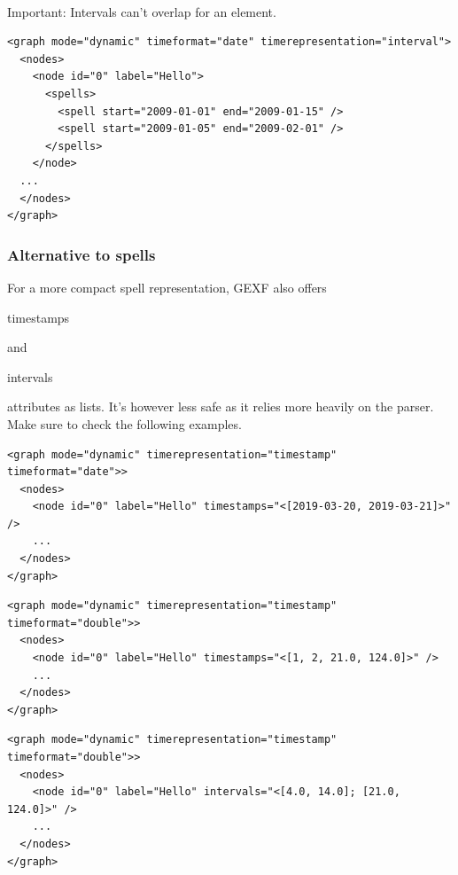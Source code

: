 \documentclass[a4paper,10pt]{article}
\begin{document}
\paragraph{}
Important: Intervals can't overlap for an element.

\lstset{ style=gexf }
\begin{lstlisting}[caption={Overlapping intervals (not allowed)}]
<graph mode="dynamic" timeformat="date" timerepresentation="interval">
  <nodes>
    <node id="0" label="Hello">
      <spells>
        <spell start="2009-01-01" end="2009-01-15" />
        <spell start="2009-01-05" end="2009-02-01" />
      </spells>
    </node>
  ...
  </nodes>
</graph>
\end{lstlisting}

\subsubsection{Alternative to spells}

For a more compact spell representation, GEXF also offers \begin{footnotesize}timestamps\end{footnotesize} and \begin{footnotesize}intervals\end{footnotesize} attributes as lists. It's however less safe as it relies more heavily on the parser. Make sure to check the following examples.

\lstset{ style=gexf }
\begin{lstlisting}[caption={Timestamp list (Date)}]
<graph mode="dynamic" timerepresentation="timestamp" timeformat="date">>
  <nodes>
    <node id="0" label="Hello" timestamps="<[2019-03-20, 2019-03-21]>" />
    ...
  </nodes>
</graph>
\end{lstlisting}

\lstset{ style=gexf }
\begin{lstlisting}[caption={Timestamp list (Double)}]
<graph mode="dynamic" timerepresentation="timestamp" timeformat="double">>
  <nodes>
    <node id="0" label="Hello" timestamps="<[1, 2, 21.0, 124.0]>" />
    ...
  </nodes>
</graph>
\end{lstlisting}

\lstset{ style=gexf }
\begin{lstlisting}[caption={Interval list (Double)}]
<graph mode="dynamic" timerepresentation="timestamp" timeformat="double">>
  <nodes>
    <node id="0" label="Hello" intervals="<[4.0, 14.0]; [21.0, 124.0]>" />
    ...
  </nodes>
</graph>
\end{lstlisting}
\end{document}
